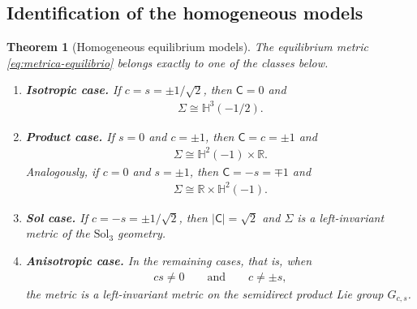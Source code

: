 \documentclass[11pt,a4paper]{amsart}
\theoremstyle{plain}
\newtheorem{theorem}{Theorem}[section]
\theoremstyle{remark}
\newcommand{\R}{\mathbb{R}}
\newcommand{\Hyp}{\mathbb{H}}
\newcommand{\C}{\mathsf{C}}
\begin{document}
\subsection{Identification of the homogeneous models}
\label{subsec:modelos-homogeneos}

\begin{theorem}[Homogeneous equilibrium models]
\label{thm:modelos-homogeneos}
The equilibrium metric \eqref{eq:metrica-equilibrio} belongs exactly to 
one of the classes below.

\begin{enumerate}[label=\textup{(\alph*)},leftmargin=*]

\item {\bf Isotropic case.}
If $c=s=\pm1/\sqrt2$, then $\C=0$ and
\begin{align*}
\Sigma\cong \Hyp^3(-1/2).
\end{align*}

\item {\bf Product case.}
If $s=0$ and $c=\pm1$, then $\C=c=\pm1$ and
\begin{align*}
\Sigma\cong\Hyp^2(-1)\times\R.
\end{align*}
Analogously, if $c=0$ and $s=\pm1$, then $\C=-s=\mp1$ and
\begin{align*}
\Sigma\cong\R\times\Hyp^2(-1).
\end{align*}

\item {\bf Sol case.}
If $c=-s=\pm1/\sqrt2$, then $|\C|=\sqrt2$ and $\Sigma$ is a left-invariant 
metric of the $\mathrm{Sol}_3$ geometry.

\item {\bf Anisotropic case.}
In the remaining cases, that is, when
\begin{align*}
cs\neq0 \qquad\text{and}\qquad c\neq\pm s,
\end{align*}
the metric is a left-invariant metric on the semidirect product Lie group $G_{c,s}$.

\end{enumerate}
\end{theorem}
\end{document}
